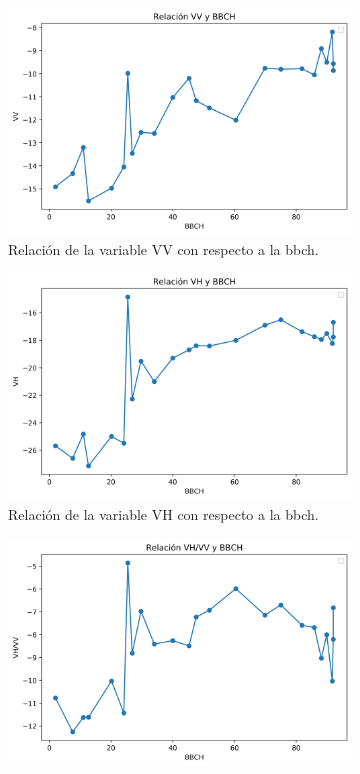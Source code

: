 \begin{figure}[h]
\centering
\begin{subfigure}{.45\textwidth}
  \centering
  \includegraphics[width=\linewidth]{archivos/VV}
  \caption{Relación de la variable VV con respecto a la \gls{bbch}. \label{fig:VV}}
\end{subfigure}%
\begin{subfigure}{.45\textwidth}
  \centering
  \includegraphics[width=\linewidth]{archivos/VH}
  \caption{Relación de la variable VH con respecto a la \gls{bbch}.\label{fig:VH}}
\end{subfigure}
\begin{subfigure}{.45\textwidth}
  \centering
  \includegraphics[width=\linewidth]{archivos/RATIO}

\end{subfigure}
\end{figure}
